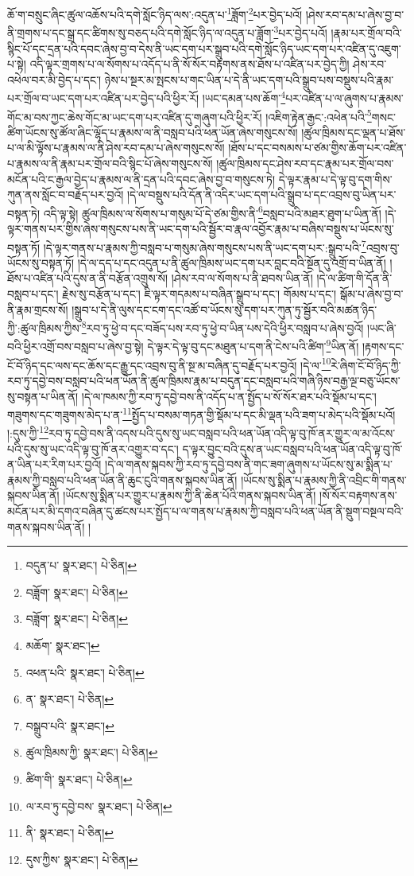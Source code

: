ཆོ་ག་བསྲུང་ཞིང་ཚུལ་འཆོས་པའི་དགེ་སློང་ཉིད་ལས་:འདུན་པ་\footnote{བདུན་པ་  སྣར་ཐང་།  པེ་ཅིན། }ཟློག་\footnote{བཟློག་  སྣར་ཐང་།  པེ་ཅིན། }པར་བྱེད་པའོ། །ཤེས་རབ་དམ་པ་ཞེས་བྱ་བ་ནི་གྲགས་པ་དང་སྒྲ་དང་ཚིགས་སུ་བཅད་པའི་དགེ་སློང་ཉིད་ལ་འདུན་པ་ཟློག་\footnote{བཟློག་  སྣར་ཐང་།  པེ་ཅིན། }པར་བྱེད་པའོ། །རྣམ་པར་གྲོལ་བའི་སྙིང་པོ་དང་དྲན་པའི་དབང་ཞེས་བྱ་བ་དེས་ནི་ཡང་དག་པར་སྒྲུབ་པའི་དགེ་སློང་ཉིད་ཡང་དག་པར་འཛིན་དུ་འཇུག་པ་སྟེ། འདི་ལྟར་གྲགས་པ་ལ་སོགས་པ་འདོད་པ་ནི་སོ་སོར་བརྟགས་ནས་ཐོས་པ་འཛིན་པར་བྱེད་ཀྱི། ཤེས་རབ་འཕེལ་བར་མི་བྱེད་པ་དང་། ཉེས་པ་སྔར་མ་སྤངས་པ་གང་ཡིན་པ་དེ་ནི་ཡང་དག་པའི་སྒྲུབ་པས་བསྡུས་པའི་རྣམ་པར་གྲོལ་བ་ཡང་དག་པར་འཛིན་པར་བྱེད་པའི་ཕྱིར་རོ། །ཡང་དམན་པས་ཆོག་\footnote{མཆོག་  སྣར་ཐང་། }པར་འཛིན་པ་ལ་ཞུགས་པ་རྣམས་གོང་མ་བས་ཀྱང་ཆེས་གོང་མ་ཡང་དག་པར་འཛིན་དུ་གཞུག་པའི་ཕྱིར་རོ། །འཇིག་རྟེན་རྒྱང་:འཕེན་པའི་\footnote{འཕན་པའི་  སྣར་ཐང་།  པེ་ཅིན། }གསང་ཚིག་ཡོངས་སུ་ཚོལ་ཞིང་ལྷོད་པ་རྣམས་ལ་ནི་བསླབ་པའི་ཕན་ཡོན་ཞེས་གསུངས་སོ། །ཚུལ་ཁྲིམས་དང་ལྡན་པ་ཐོས་པ་ལ་མི་ལྟོས་པ་རྣམས་ལ་ནི་ཤེས་རབ་དམ་པ་ཞེས་གསུངས་སོ། །ཐོས་པ་དང་བསམས་པ་ཙམ་གྱིས་ཆོག་པར་འཛིན་པ་རྣམས་ལ་ནི་རྣམ་པར་གྲོལ་བའི་སྙིང་པོ་ཞེས་གསུངས་སོ། །ཚུལ་ཁྲིམས་དང་ཤེས་རབ་དང་རྣམ་པར་གྲོལ་བས་མངོན་པའི་ང་རྒྱལ་བྱེད་པ་རྣམས་ལ་ནི་དྲན་པའི་དབང་ཞེས་བྱ་བ་གསུངས་ཏེ། དེ་ལྟར་རྣམ་པ་དེ་ལྟ་བུ་དག་གིས་ཀུན་ནས་སློང་བ་བརྗོད་པར་བྱའོ། །དེ་ལ་བསྡུས་པའི་དོན་ནི་འདིར་ཡང་དག་པའི་སྒྲུབ་པ་དང་འབྲས་བུ་ཡིན་པར་བསྟན་ཏེ། འདི་ལྟ་སྟེ། ཚུལ་ཁྲིམས་ལ་སོགས་པ་གསུམ་པོ་དེ་ཙམ་གྱིས་ནི་\footnote{ན་  སྣར་ཐང་།  པེ་ཅིན། }བསླབ་པའི་མཐར་ཐུག་པ་ཡིན་ནོ། །དེ་ལྟར་གནས་པར་གྱིས་ཞེས་གསུངས་པས་ནི་ཡང་དག་པའི་སྦྱོར་བ་རྣལ་འབྱོར་རྣམ་པ་བཞིས་བསྡུས་པ་ཡོངས་སུ་བསྟན་ཏོ། །དེ་ལྟར་གནས་པ་རྣམས་ཀྱི་བསླབ་པ་གསུམ་ཞེས་གསུངས་པས་ནི་ཡང་དག་པར་:སྒྲུབ་པའི་\footnote{བསྒྲུབ་པའི་  སྣར་ཐང་། }འབྲས་བུ་ཡོངས་སུ་བསྟན་ཏོ། །དེ་ལ་དད་པ་དང་འདུན་པ་ནི་ཚུལ་ཁྲིམས་ཡང་དག་པར་བླང་བའི་སྔོན་དུ་འགྲོ་བ་ཡིན་ནོ། །ཐོས་པ་འཛིན་པའི་དུས་ན་ནི་བརྩོན་འགྲུས་སོ། །ཤེས་རབ་ལ་སོགས་པ་ནི་ཐབས་ཡིན་ནོ། །དེ་ལ་ཚིག་གི་དོན་ནི་བསླབ་པ་དང་། རྗེས་སུ་བརྩོན་པ་དང་། ཇི་ལྟར་གདམས་པ་བཞིན་སྒྲུབ་པ་དང་། གོམས་པ་དང་། སྒོམ་པ་ཞེས་བྱ་བ་ནི་རྣམ་གྲངས་སོ། །སྒྲུབ་པ་དེ་ནི་ལུས་དང་ངག་དང་འཚོ་བ་ཡོངས་སུ་དག་པར་ཀུན་ཏུ་སྦྱོར་བའི་མཚན་ཉིད་ཀྱི་:ཚུལ་ཁྲིམས་ཀྱིས་\footnote{ཚུལ་ཁྲིམས་ཀྱི་  སྣར་ཐང་།  པེ་ཅིན། }རབ་ཏུ་ཕྱེ་བ་དང་བཟོད་པས་རབ་ཏུ་ཕྱེ་བ་ཡིན་པས་དེའི་ཕྱིར་བསླབ་པ་ཞེས་བྱའོ། །ཡང་ཞི་བའི་ཕྱིར་འགྲོ་བས་བསླབ་པ་ཞེས་བྱ་སྟེ། དེ་ལྟར་དེ་ལྟ་བུ་དང་མཐུན་པ་དག་ནི་ངེས་པའི་ཚིག་\footnote{ཚིག་གི་  སྣར་ཐང་།  པེ་ཅིན། }ཡིན་ནོ། །རྟགས་དང་ངོ་བོ་ཉིད་དང་ལས་དང་ཆོས་དང་རྒྱུ་དང་འབྲས་བུ་ནི་སྔ་མ་བཞིན་དུ་བརྗོད་པར་བྱའོ། །དེ་ལ་\footnote{ལ་རབ་ཏུ་དབྱེ་བས་  སྣར་ཐང་།  པེ་ཅིན། }རེ་ཞིག་ངོ་བོ་ཉིད་ཀྱི་རབ་ཏུ་དབྱེ་བས་བསླབ་པའི་ཕན་ཡོན་ནི་ཚུལ་ཁྲིམས་རྣམ་པ་བདུན་དང་བསླབ་པའི་གཞི་ཉིས་བརྒྱ་ལྔ་བཅུ་ཡོངས་སུ་བསྟན་པ་ཡིན་ནོ། །དེ་ལ་ཁམས་ཀྱི་རབ་ཏུ་དབྱེ་བས་ནི་འདོད་པ་ན་སྤྱོད་པ་སོ་སོར་ཐར་པའི་སྡོམ་པ་དང་། གཟུགས་དང་གཟུགས་མེད་པ་ན་\footnote{ནི་  སྣར་ཐང་།  པེ་ཅིན། }སྤྱོད་པ་བསམ་གཏན་གྱི་སྡོམ་པ་དང་མི་ལྡན་པའི་ཟག་པ་མེད་པའི་སྡོམ་པའོ། །:དུས་ཀྱི་\footnote{དུས་ཀྱིས་  སྣར་ཐང་།  པེ་ཅིན། }རབ་ཏུ་དབྱེ་བས་ནི་འདས་པའི་དུས་སུ་ཡང་བསླབ་པའི་ཕན་ཡོན་འདི་ལྟ་བུ་ཁོ་ནར་གྱུར་ལ་མ་འོངས་པའི་དུས་སུ་ཡང་འདི་ལྟ་བུ་ཁོ་ནར་འགྱུར་བ་དང་། ད་ལྟར་བྱུང་བའི་དུས་ན་ཡང་བསླབ་པའི་ཕན་ཡོན་འདི་ལྟ་བུ་ཁོ་ན་ཡིན་པར་རིག་པར་བྱའོ། །དེ་ལ་གནས་སྐབས་ཀྱི་རབ་ཏུ་དབྱེ་བས་ནི་གང་ཟག་ཞུགས་པ་ཡོངས་སུ་མ་སྨིན་པ་རྣམས་ཀྱི་བསླབ་པའི་ཕན་ཡོན་ནི་ཆུང་ངུའི་གནས་སྐབས་ཡིན་ནོ། །ཡོངས་སུ་སྨིན་པ་རྣམས་ཀྱི་ནི་འབྲིང་གི་གནས་སྐབས་ཡིན་ནོ། །ཡོངས་སུ་སྨིན་པར་གྱུར་པ་རྣམས་ཀྱི་ནི་ཆེན་པོའི་གནས་སྐབས་ཡིན་ནོ། །སོ་སོར་བརྟགས་ནས་མངོན་པར་མི་དགའ་བཞིན་དུ་ཚངས་པར་སྤྱོད་པ་ལ་གནས་པ་རྣམས་ཀྱི་བསླབ་པའི་ཕན་ཡོན་ནི་སྡུག་བསྔལ་བའི་གནས་སྐབས་ཡིན་ནོ། །
